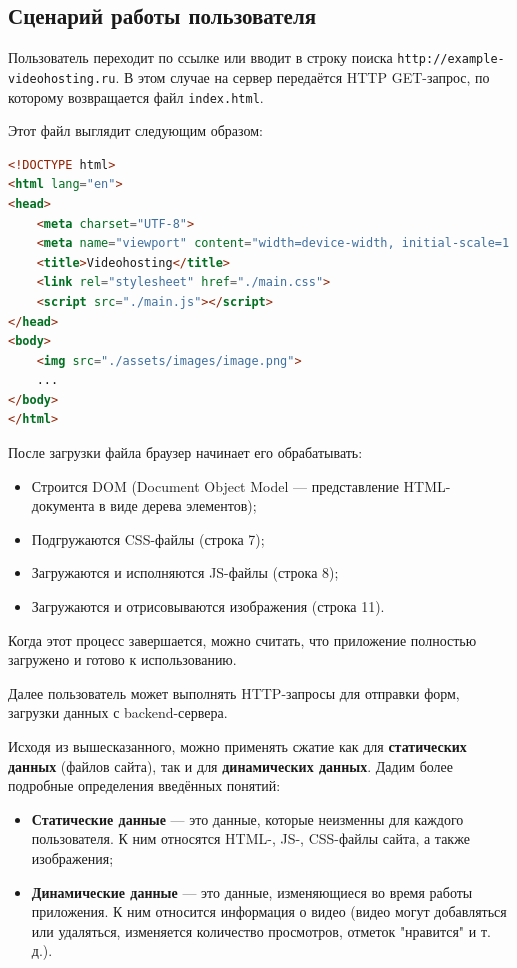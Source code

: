 \documentclass[12pt]{article}
\begin{document}
\subsection{Сценарий работы пользователя}

Пользователь переходит по ссылке или вводит в строку поиска \texttt{http://example-videohosting.ru}.
В этом случае на сервер передаётся HTTP GET-запрос, по которому возвращается файл \verb|index.html|.

Этот файл выглядит следующим образом:

\begin{lstlisting}[language=HTML]
<!DOCTYPE html>
<html lang="en">
<head>
    <meta charset="UTF-8">
    <meta name="viewport" content="width=device-width, initial-scale=1.0">
    <title>Videohosting</title>
    <link rel="stylesheet" href="./main.css">
    <script src="./main.js"></script>
</head>
<body>
    <img src="./assets/images/image.png">
    ...
</body>
</html>
\end{lstlisting}

После загрузки файла браузер начинает его обрабатывать:

\begin{itemize}
    \item Строится DOM (Document Object Model — представление HTML-документа в виде дерева элементов);
    \item Подгружаются CSS-файлы (строка 7);
    \item Загружаются и исполняются JS-файлы (строка 8);
    \item Загружаются и отрисовываются изображения (строка 11).
\end{itemize}

Когда этот процесс завершается, можно считать, что приложение полностью загружено и готово к использованию.

Далее пользователь может выполнять HTTP-запросы для отправки форм, загрузки данных с backend-сервера.

Исходя из вышесказанного, можно применять сжатие как для \textbf{статических данных} (файлов сайта), так и для \textbf{динамических данных}.
Дадим более подробные определения введённых понятий:

\begin{itemize}
    \item \textbf{Статические данные} — это данные, которые неизменны для каждого пользователя.
          К ним относятся HTML-, JS-, CSS-файлы сайта, а также изображения;

    \item \textbf{Динамические данные} — это данные, изменяющиеся во время работы приложения.
          К ним относится информация о видео (видео могут добавляться или удаляться, изменяется количество просмотров, отметок "нравится" и т. д.).
\end{itemize}
\end{document}
